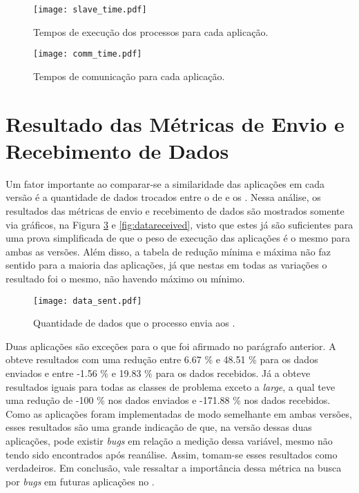 \begin{figure}[h]
  \centering
  \caption{Tempos de execução dos processos \slaves para cada aplicação.}
  \label{fig:slavetime}
  \texttt{[image: slave\_time.pdf]}
\end{figure}

\clearpage

\begin{figure}[h]
  \centering
  \caption{Tempos de comunicação para cada aplicação.}
  \label{fig:commtime}
  \texttt{[image: comm\_time.pdf]}
\end{figure}

\clearpage

\section{Resultado das Métricas de Envio e Recebimento de Dados}
\label{sec:metricasdados}

Um fator importante ao comparar-se a similaridade das aplicações em cada versão é a quantidade de dados trocados entre o \cluster de \IO e os \CCs. Nessa análise, os resultados das métricas de envio e recebimento de dados são mostrados somente via gráficos, na Figura \ref{fig:datasent} e \ref{fig:datareceived}, visto que estes já são suficientes para uma prova simplificada de que o peso de execução das aplicações é o mesmo para ambas as versões. Além disso, a tabela de redução mínima e máxima não faz sentido para a maioria das aplicações, já que nestas em todas as variações o resultado foi o mesmo, não havendo máximo ou mínimo.

\begin{figure}[h]
  \centering
  \caption{Quantidade de dados que o processo \master envia aos \slaves.}
  \label{fig:datasent}
  \texttt{[image: data\_sent.pdf]}
\end{figure}

\clearpage

Duas aplicações são exceções para o que foi afirmado no parágrafo anterior. A \KM obteve resultados com uma redução entre 6.67 \% e 48.51 \% para os dados enviados e entre -1.56 \% e 19.83 \% para os dados recebidos. Já a \LU obteve resultados iguais para todas as classes de problema exceto a \textit{large}, a qual teve uma redução de -100 \% nos dados enviados e -171.88 \% nos dados recebidos. Como as aplicações foram implementadas de modo semelhante em ambas versões, esses resultados são uma grande indicação de que, na versão \ASYNC dessas duas aplicações, pode existir \textit{bugs} em relação a medição dessa variável, mesmo não tendo sido encontrados após reanálise. Assim, tomam-se esses resultados como verdadeiros. Em conclusão, vale ressaltar a importância dessa métrica na busca por \textit{bugs} em futuras aplicações no \mppa.

